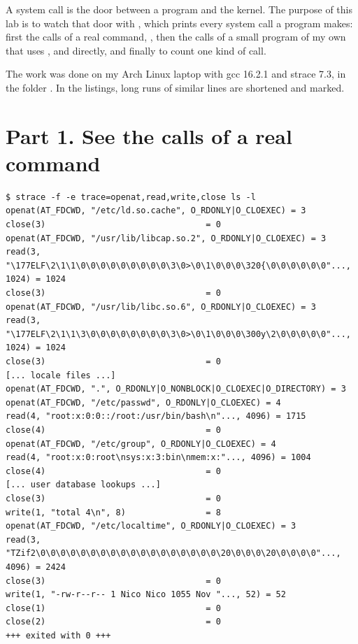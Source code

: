\documentclass[11pt,a4paper]{article}
\begin{document}
\utmtitlepage
\tableofcontents
\newpage


A system call is the door between a program and the kernel. The purpose of this lab is to watch
that door with , which prints every system call a program makes: first the calls of
a real command, , then the calls of a small program of my own that uses ,
 and  directly, and finally to count one kind of call.

The work was done on my Arch Linux laptop with gcc 16.2.1 and strace 7.3, in the folder
. In the listings, long runs of similar lines are shortened and
marked.

\section{Part 1. See the calls of a real command}

\begin{lstlisting}[caption={The calls of ls -l (shortened)}]
$ strace -f -e trace=openat,read,write,close ls -l
openat(AT_FDCWD, "/etc/ld.so.cache", O_RDONLY|O_CLOEXEC) = 3
close(3)                                = 0
openat(AT_FDCWD, "/usr/lib/libcap.so.2", O_RDONLY|O_CLOEXEC) = 3
read(3, "\177ELF\2\1\1\0\0\0\0\0\0\0\0\0\3\0>\0\1\0\0\0\320{\0\0\0\0\0\0"..., 1024) = 1024
close(3)                                = 0
openat(AT_FDCWD, "/usr/lib/libc.so.6", O_RDONLY|O_CLOEXEC) = 3
read(3, "\177ELF\2\1\1\3\0\0\0\0\0\0\0\0\3\0>\0\1\0\0\0\300y\2\0\0\0\0\0"..., 1024) = 1024
close(3)                                = 0
[... locale files ...]
openat(AT_FDCWD, ".", O_RDONLY|O_NONBLOCK|O_CLOEXEC|O_DIRECTORY) = 3
openat(AT_FDCWD, "/etc/passwd", O_RDONLY|O_CLOEXEC) = 4
read(4, "root:x:0:0::/root:/usr/bin/bash\n"..., 4096) = 1715
close(4)                                = 0
openat(AT_FDCWD, "/etc/group", O_RDONLY|O_CLOEXEC) = 4
read(4, "root:x:0:root\nsys:x:3:bin\nmem:x:"..., 4096) = 1004
close(4)                                = 0
[... user database lookups ...]
close(3)                                = 0
write(1, "total 4\n", 8)                = 8
openat(AT_FDCWD, "/etc/localtime", O_RDONLY|O_CLOEXEC) = 3
read(3, "TZif2\0\0\0\0\0\0\0\0\0\0\0\0\0\0\0\0\0\0\20\0\0\0\20\0\0\0\0"..., 4096) = 2424
close(3)                                = 0
write(1, "-rw-r--r-- 1 Nico Nico 1055 Nov "..., 52) = 52
close(1)                                = 0
close(2)                                = 0
+++ exited with 0 +++
\end{lstlisting}
\end{document}
